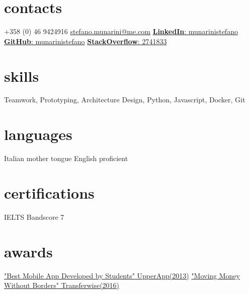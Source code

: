 \documentclass[]{friggeri-cv}
\begin{document}


\begin{aside}
\section{contacts}
+358 (0) 46 9424916
\href{mailto:stefano.munarini@me.com}{stefano.munarini@me.com}
\href{https://it.linkedin.com/in/munarinistefano}{\textbf{LinkedIn}:
munarinistefano}
\href{https://github.com/stefanomunarini}{\textbf{GitHub}:
munarinistefano}
\href{http://stackexchange.com/users/2741833/stefano-munarini}{\textbf{StackOverflow}:
2741833}
\section{skills}
Teamwork, Prototyping,
Architecture Design,
Python, Javascript,
Docker, Git
\section{languages}
Italian mother tongue
English proficient
\section{certifications}
IELTS Bandscore 7
\section{awards}
\href{http://www.wired.it/mobile/app/2013/12/17/upperapp-migliori-app-studenti/}{"Best Mobile App Developed by Students" UpperApp(2013)}
\href{https://devpost.com/software/donatewise}{"Moving Money Without Borders" Transferwise(2016)}
\end{aside}

\end{document}
